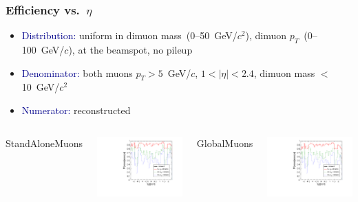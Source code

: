 \documentclass[compress]{beamer}
\begin{document}
\begin{frame}
\frametitle{Efficiency vs.\ $\eta$}
\begin{itemize}
\item \textcolor{darkblue}{Distribution:} uniform in dimuon mass~(0--50~GeV/$c^2$), dimuon $p_T$~(0--100~GeV/$c$), at the beamspot, no pileup

\item \textcolor{darkblue}{Denominator:} both muons $p_T > 5$~GeV/$c$, $1 < |\eta| < 2.4$, dimuon mass $<$ 10~GeV/$c^2$

\item \textcolor{darkblue}{Numerator:} reconstructed
\end{itemize}

\vfill
\begin{columns}
\centering StandAloneMuons

\includegraphics[width=\linewidth]{eta_mass10cut_StandAloneMuon.pdf}

\centering GlobalMuons

\includegraphics[width=\linewidth]{eta_mass10cut_GlobalMuon.pdf}


\end{columns}
\end{frame}
\end{document}
